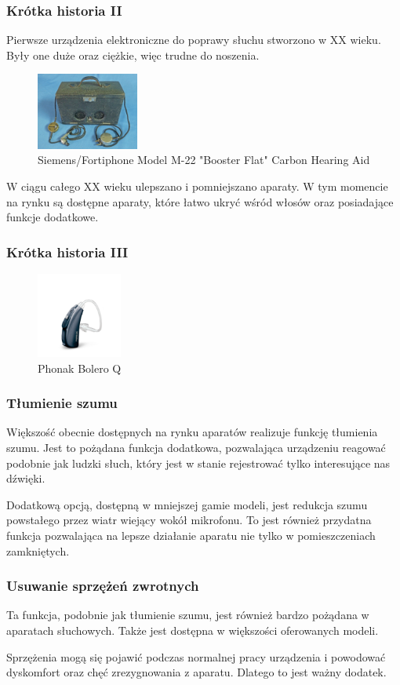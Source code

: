 \documentclass{beamer}
\begin{document}
\begin{frame}
\frametitle{Krótka historia II}
Pierwsze urządzenia elektroniczne do poprawy słuchu stworzono w XX wieku. Były one duże oraz ciężkie, więc trudne do noszenia.
\begin{figure}
    \includegraphics[width=0.3\textwidth]{siemens_old}
    \caption{Siemens/Fortiphone Model M-22 "Booster Flat" Carbon Hearing Aid}
    \label{fig:siemens-old}
\end{figure}
\end{frame}

\begin{frame}
W ciągu całego XX wieku ulepszano i pomniejszano aparaty. W tym momencie na rynku są dostępne aparaty, które łatwo ukryć wśród włosów oraz posiadające funkcje dodatkowe.
\frametitle{Krótka historia III}
\begin{figure}
    \includegraphics[width=0.25\textwidth]{phonak}
    \caption{Phonak Bolero Q}
    \label{fig:phonak}
\end{figure}
\end{frame}

\begin{frame}
\frametitle{Tłumienie szumu}
Większość obecnie dostępnych na rynku aparatów realizuje funkcję tłumienia szumu. Jest to pożądana funkcja dodatkowa, pozwalająca urządzeniu reagować podobnie jak ludzki słuch, który jest w stanie rejestrować tylko interesujące nas dźwięki. 

Dodatkową opcją, dostępną w mniejszej gamie modeli, jest redukcja szumu powstałego przez wiatr wiejący wokół mikrofonu. To jest również przydatna funkcja pozwalająca na lepsze działanie aparatu nie tylko w pomieszczeniach zamkniętych.
\end{frame}

\begin{frame}
\frametitle{Usuwanie sprzężeń zwrotnych}
Ta funkcja, podobnie jak tłumienie szumu, jest również bardzo pożądana w aparatach słuchowych. Także jest dostępna w większości oferowanych modeli.

Sprzężenia mogą się pojawić podczas normalnej pracy urządzenia i powodować dyskomfort oraz chęć zrezygnowania z aparatu. Dlatego to jest ważny dodatek.
\end{frame}
\end{document}
